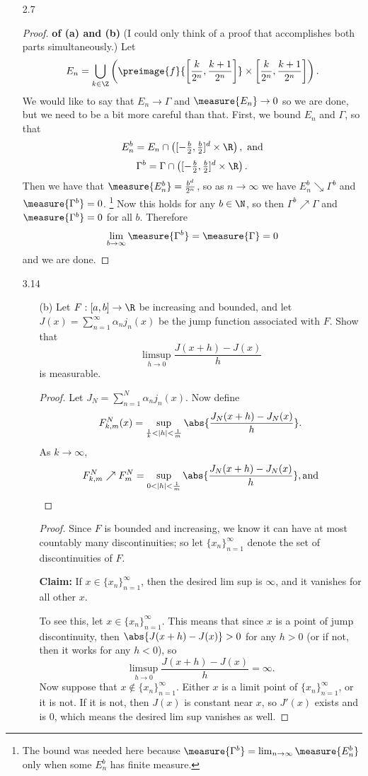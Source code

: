 \documentclass[letterpaper]{article}
\begin{document}
\begin{enumerate}
\item[2.7] \mbox{}
	\begin{proof} \textbf{of (a) and (b)} (I could only think of a proof that accomplishes both parts simultaneously.) Let 
	$$E_n = \bigcup_{k\in\Z}\left(\preimage{f}{\left[\frac{k}{2^n}, \frac{k+1}{2^n}\right]}\times\left[\frac{k}{2^n}, \frac{k+1}{2^n}\right]\right).$$
	We would like to say that $E_n\to\Gamma$ and $\measure{E_n}\to0$ so we are done, but we need to be a bit more careful than that. First, we bound $E_n$ and $\Gamma$, so that 
	$$E_n^b = E_n\cap\left([-\tfrac{b}{2}, \tfrac{b}{2}]^d\times\R\right), \text{ and}$$
	$$\Gamma^b = \Gamma\cap\left([-\tfrac{b}{2}, \tfrac{b}{2}]^d\times\R\right).$$
	Then we have that $\measure{E^b_n}=\frac{b^d}{2^n}$, so as $n\to\infty$ we have $E^b_n\searrow\Gamma^b$ and $\measure{\Gamma^b}=0$. \footnote{The bound was needed here because $\measure{\Gamma^b}=\lim_{n\to\infty}\measure{E^b_n}$ only when some $E^b_n$ has finite measure.} Now this holds for any $b\in\N$, so then $\Gamma^b\nearrow\Gamma$ and $\measure{\Gamma^b}=0$ for all $b$. Therefore  
	$$\lim_{b\to\infty}\measure{\Gamma^b}=\measure{\Gamma}=0$$
	and we are done. 
	\end{proof}

\item[3.14] 
	\begin{enumerate}
		\item[(b)] Let $F:[a, b]\to\R$ be increasing and bounded, and let $J(x)=\sum_{n=1}^\infty\alpha_nj_n(x)$ be the jump function associated with $F$. Show that 
		$$\limsup_{h\to 0}\frac{J(x+h)-J(x)}{h}$$
		is measurable.
		\begin{proof}
		Let $J_N=\sum_{n=1}^N\alpha_n j_n(x)$. Now define 
		$$F^N_{k,m}(x)=\sup_{\frac{1}{k}<|h|<\frac{1}{m}}\abs{\frac{J_N(x+h)-J_N(x)}{h}}.$$
		As $k\to\infty$, 
		$$F^N_{k,m}\nearrow F^N_m=\sup_{0<|h|<\frac{1}{m}}\abs{\frac{J_N(x+h)-J_N(x)}{h}}, \text{and}$$
		
		\end{proof}				
		
		 
		\begin{proof}
		Since $F$ is bounded and increasing, we know it can have at most countably many discontinuities; so let $\{x_n\}_{n=1}^\infty$ denote the set of discontinuities of $F$. 
		
		\textbf{Claim:} If $x\in\{x_n\}_{n=1}^\infty$, then the desired lim sup is $\infty$, and it vanishes for all other $x$. 
		
		To see this, let $x\in\{x_n\}_{n=1}^\infty$. This means that since $x$ is a point of jump discontinuity, then $\abs{J(x+h)-J(x)}>0$ for any $h>0$ (or if not, then it works for any $h<0$), so 
		$$\limsup_{h\to 0}\frac{J(x+h)-J(x)}{h}=\infty.$$
		Now suppose that $x\not\in\{x_n\}_{n=1}^\infty$. Either $x$ is a limit point of $\{x_n\}_{n=1}^\infty$, or it is not. If it is not, then $J(x)$ is constant near $x$, so $J'(x)$ exists and is 0, which means the desired lim sup vanishes as well. 
		

\end{proof}
\end{enumerate}
\end{enumerate}
\end{document}
